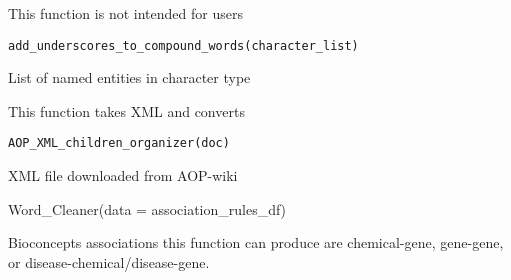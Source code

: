 \documentclass[a4paper]{book}
\begin{document}
%
\begin{Description}\relax
This function is not intended for users
\end{Description}
%
\begin{Usage}
\begin{verbatim}
add_underscores_to_compound_words(character_list)
\end{verbatim}
\end{Usage}
%
\begin{Arguments}
\begin{ldescription}
\item[\code{character\_list}] List of named entities in character type
\end{ldescription}
\end{Arguments}
%
\begin{Description}\relax
This function takes XML and converts
\end{Description}
%
\begin{Usage}
\begin{verbatim}
AOP_XML_children_organizer(doc)
\end{verbatim}
\end{Usage}
%
\begin{Arguments}
\begin{ldescription}
\item[\code{doc}] XML file downloaded from AOP-wiki
\end{ldescription}
\end{Arguments}
%
\begin{Examples}
\begin{ExampleCode}
Word_Cleaner(data = association_rules_df)
\end{ExampleCode}
\end{Examples}
%
\begin{Description}\relax
Bioconcepts associations this function can produce are chemical-gene, gene-gene, or disease-chemical/disease-gene.
\end{Description}
\end{document}
